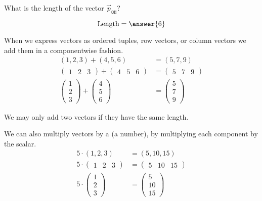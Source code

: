 \documentclass{ximera}
\begin{document}
\begin{question}
  What is the length of the vector $\vec{p}_{\texttt{OH}}$?
  \begin{prompt}
  \[
  \text{Length} = \answer{6}
  \]
  \end{prompt}
\end{question}
When we express vectors as ordered tuples, row vectors, or column
vectors we add them in a componentwise fashion.
\begin{align*}
  (1,2,3) + (4,5,6) &= (5,7,9)\\
  \begin{pmatrix} 1 & 2 & 3   \end{pmatrix} + \begin{pmatrix} 4 & 5 & 6   \end{pmatrix}&= \begin{pmatrix} 5 & 7 & 9   \end{pmatrix}\\
  \begin{pmatrix} 1\\ 2\\ 3   \end{pmatrix} + \begin{pmatrix} 4\\ 5\\ 6   \end{pmatrix} &= \begin{pmatrix} 5\\ 7\\ 9   \end{pmatrix}
\end{align*}
\begin{warning}
  We may only add two vectors if they have the same length.
\end{warning}


We can also multiply vectors by a  (a number), by
multiplying each component by the scalar.
\begin{align*}
  5\cdot   (1,2,3) &= (5,10,15)\\
  5\cdot \begin{pmatrix} 1 & 2 & 3   \end{pmatrix}  &= \begin{pmatrix} 5 & 10 & 15   \end{pmatrix}\\
  5\cdot  \begin{pmatrix} 1\\ 2\\ 3   \end{pmatrix} &= \begin{pmatrix} 5\\ 10\\ 15   \end{pmatrix}
\end{align*}
\end{document}
